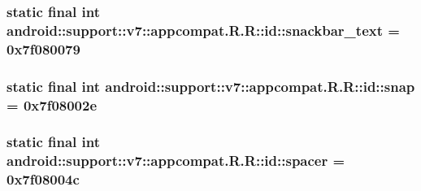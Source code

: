 \hypertarget{classandroid_1_1support_1_1v7_1_1appcompat_1_1_r_1_1id_874a61f260322f744990b4eebef75781}{
\subsubsection[{snackbar\_\-text}]{\setlength{\rightskip}{0pt plus 5cm}static final int android::support::v7::appcompat.R.R::id::snackbar\_\-text = 0x7f080079}}
\label{classandroid_1_1support_1_1v7_1_1appcompat_1_1_r_1_1id_874a61f260322f744990b4eebef75781}


\hypertarget{classandroid_1_1support_1_1v7_1_1appcompat_1_1_r_1_1id_bc7f9989d449f79b3a7c9e1976426bc0}{
\subsubsection[{snap}]{\setlength{\rightskip}{0pt plus 5cm}static final int android::support::v7::appcompat.R.R::id::snap = 0x7f08002e}}
\label{classandroid_1_1support_1_1v7_1_1appcompat_1_1_r_1_1id_bc7f9989d449f79b3a7c9e1976426bc0}


\hypertarget{classandroid_1_1support_1_1v7_1_1appcompat_1_1_r_1_1id_a4aa1962f2696d8396c814d3c769331f}{
\subsubsection[{spacer}]{\setlength{\rightskip}{0pt plus 5cm}static final int android::support::v7::appcompat.R.R::id::spacer = 0x7f08004c}}
\label{classandroid_1_1support_1_1v7_1_1appcompat_1_1_r_1_1id_a4aa1962f2696d8396c814d3c769331f}



